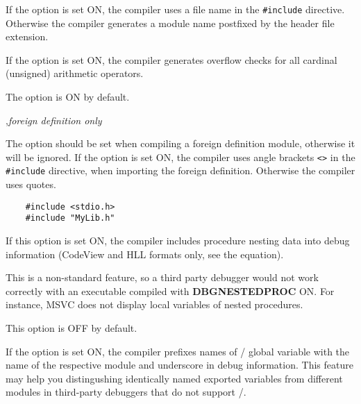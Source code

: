 \begin{description}
\ifgenc
{}
        \MLBegin{}\ModeC{}\MLEnd{}

        If the option is set ON, the compiler uses a file name
        in the \verb|#include| directive. Otherwise the compiler
        generates a module name postfixed by the header file extension.

\fi

\ifgenc\else
{}
        \MLBegin{}\ModeC{}\MLEnd{} \inline

        If the option is set ON, the compiler generates overflow checks
        for all cardinal (unsigned) arithmetic operators.

        The option is ON by default.
\fi

\ifgenc
{}
        \MLBegin{}\ModeC{},{\em foreign definition only}\MLEnd{} \header

        The option should be set when compiling a foreign definition
        module, otherwise it will be ignored.
        If the option is set ON, the compiler uses angle brackets \verb+<>+
        in the \verb|#include| directive, when importing the foreign
        definition. Otherwise the compiler uses quotes.
\begin{verbatim}
    #include <stdio.h>
    #include "MyLib.h"
\end{verbatim}
\fi

\ifgencode
{}
        \MLBegin{}\ModeC{}\MLEnd{}

        If this option is set ON, the compiler includes procedure nesting data
        into debug information (CodeView and HLL formats only, see the
         equation).

        This is a non-standard feature, so a third party debugger would not
        work correctly with an executable compiled with {\bf DBGNESTEDPROC} ON.
        For instance, MSVC does not display local variables of nested procedures.

        This option is OFF by default.

        \MLBegin{}\ModeC{}\MLEnd{}

        If the option is set ON, the compiler prefixes names of
        \mt{}/\ot{} global variable with the name of the respective module
        and underscore in debug information. This feature may help you
        distingushing identically named exported variables from different
        modules in third-party debuggers that do not support \mt{}/\ot{}.


\end{description}
